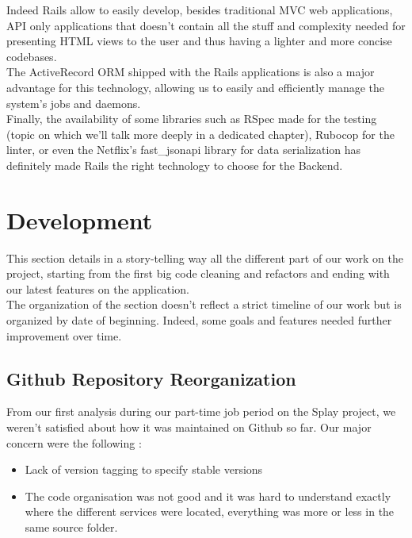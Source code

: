 \documentclass{eplmastersthesis}
\begin{document}
        Indeed Rails allow to easily develop, besides traditional MVC web
        applications, API only applications that doesn't contain all the stuff
        and complexity needed for presenting HTML views to the user and thus
        having a lighter and more concise codebases.\\
        The ActiveRecord \cite{activerecord} ORM shipped with the Rails
        applications is also a major advantage for this technology, allowing us
        to easily and efficiently manage the system's jobs and daemons.\\
        Finally, the availability of some libraries such as RSpec made for the
        testing (topic on which we'll talk more deeply in a dedicated chapter),
        Rubocop for the linter, or even the Netflix's fast\_jsonapi library for
        data serialization has definitely made Rails the right technology to
        choose for the Backend.

    \section{Development}

      This section details in a story-telling way all the different part
      of our work on the project, starting from the first big code cleaning
      and refactors and ending with our latest features on the application.\\

      The organization of the section doesn't reflect a strict timeline of
      our work but is organized by date of beginning. Indeed, some goals
      and features needed further improvement over time.

      \subsection{Github Repository Reorganization}

        From our first analysis during our part-time job period on the Splay
        project, we weren't satisfied about how it was maintained on Github so
        far. Our major concern were the following :

        \begin{itemize}
          \item Lack of version tagging to specify stable versions
          \item The code organisation was not good and it was hard to
          understand exactly where the different services were located,
          everything was more or less in the same source folder.
        \end{itemize}
\end{document}

